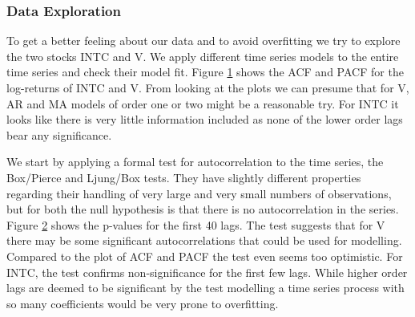 \subsubsection{Data Exploration}
To get a better feeling about our data and to avoid overfitting we try to explore the two stocks INTC and V. We apply different time series models to the entire time series and check their model fit. Figure \ref{fig:INTC_V_ACF_log_returns} shows the ACF and PACF for the log-returns of INTC and V. From looking at the plots we can presume that for V, AR and MA models of order one or two might be a reasonable try. For INTC it looks like there is very little information included as none of the lower order lags bear any significance. 

We start by applying a formal test for autocorrelation to the time series, the Box/Pierce and Ljung/Box tests. They have slightly different properties regarding their handling of very large and very small numbers of observations, but for both the null hypothesis is that there is no autocorrelation in the series. Figure \ref{fig:ljungbox} shows the p-values for the first 40 lags. The test suggests that for V there may be some significant autocorrelations that could be used for modelling. Compared to the plot of ACF and PACF the test even seems too optimistic. For INTC, the test confirms non-significance for the first few lags. While higher order lags are deemed to be significant by the test modelling a time series process with so many coefficients would be very prone to overfitting. 

\begin{figure}[h]
    \centering
    \begin{adjustbox}{width=.95\textwidth,center}
    
    \end{adjustbox}
    
    \begin{adjustbox}{width=.95\textwidth,center}
    
    \end{adjustbox} 
    
    \caption{}
    \label{fig:INTC_V_ACF_log_returns}
\end{figure}{}

\begin{figure}[h]
    \centering
    \begin{adjustbox}{width=.95\textwidth,center}
    
    
    \end{adjustbox}
    \caption{}
    \label{fig:ljungbox}
\end{figure}{}


